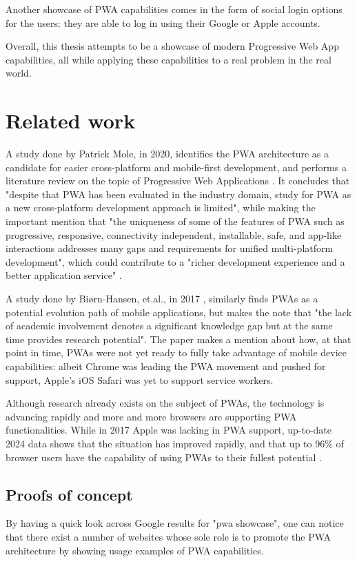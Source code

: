 Another showcase of PWA capabilities comes in the form of social login options for the users: they are able to log in using their Google or Apple accounts.

Overall, this thesis attempts to be a showcase of modern Progressive Web App capabilities, all while applying these capabilities to a real problem in the real world.

\section{Related work}

A study done by Patrick Mole, in 2020, identifies the PWA architecture as a candidate for easier cross-platform and mobile-first development, and performs a literature review on the topic of Progressive Web Applications \cite{MoleLitRev}. It concludes that "despite that PWA has been evaluated in the industry domain, study for PWA as a new cross-platform  development  approach  is  limited", while making the important mention that "the uniqueness of some of the features of PWA such as progressive, responsive, connectivity independent, installable,  safe, and  app-like interactions addresses many  gaps  and  requirements  for  unified  multi-platform development", which could contribute to a "richer development experience and a better application service" \cite{MoleLitRev}.

A study done by Biørn-Hansen, et.al., in 2017 \cite{Biorn2017}, similarly finds PWAs as a potential evolution path of mobile applications, but makes the note that "the lack of academic involvement denotes a significant knowledge gap but at the same time provides research potential". The paper makes a mention about how, at that point in time, PWAs were not yet ready to fully take advantage of mobile device capabilities: albeit Chrome was leading the PWA movement and pushed for support, Apple's iOS Safari was yet to support service workers.

Although research already exists on the subject of PWAs, the technology is advancing rapidly and more and more browsers are supporting PWA functionalities. While in 2017 Apple was lacking in PWA support, up-to-date 2024 data shows that the situation has improved rapidly, and that up to 96\% of browser users have the capability of using PWAs to their fullest potential \cite{CanIUsePWA}.

\subsection{Proofs of concept}
By having a quick look across Google results for "pwa showcase", one can notice that there exist a number of websites whose sole role is to promote the PWA architecture by showing usage examples of PWA capabilities.

